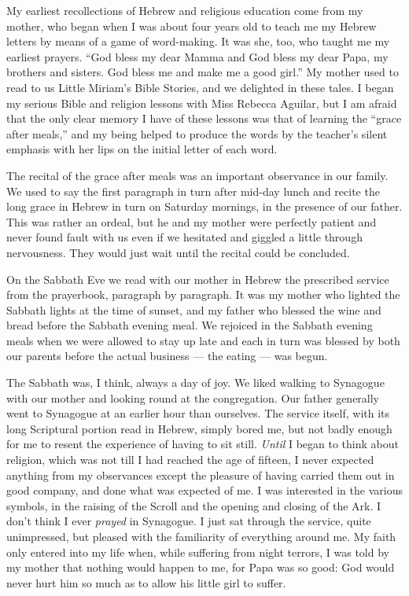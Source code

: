 My earliest recollections of Hebrew and religious
education come from my mother, who began when I was
about four years old to teach me my Hebrew letters by
means of a game of word-making. It was she, too, who
taught me my earliest prayers. “God bless my dear
Mamma and God bless my dear Papa, my brothers and
sisters. God bless me and make me a good girl.” My
mother used to read to us Little Miriam’s Bible Stories,
and we delighted in these tales. I began my serious
Bible and religion lessons with Miss Rebecca Aguilar,
but I am afraid that the only clear memory I have of
these lessons was that of learning the “grace after meals,”
and my being helped to produce the words by the teacher’s
silent emphasis with her lips on the initial letter of
each word.

The recital of the grace after meals was an important
observance in our family. We used to say the first
paragraph in turn after mid-day lunch and recite the
long grace in Hebrew in turn on Saturday mornings, in
the presence of our father. This was rather an ordeal,
but he and my mother were perfectly patient and never
found fault with us even if we hesitated and giggled
a little through nervousness. They would just wait until
the recital could be concluded.

On the Sabbath Eve we read with our mother in
Hebrew the prescribed service from the prayerbook,
paragraph by paragraph. It was my mother who lighted
the Sabbath lights at the time of sunset, and my father
who blessed the wine and bread before the Sabbath
evening meal. We rejoiced in the Sabbath evening meals
when we were allowed to stay up late and each in turn
was blessed by both our parents before the actual business
— the eating — was begun.

The Sabbath was, I think, always a day of joy. We
liked walking to Synagogue with our mother and looking
round at the congregation. Our father generally went to
Synagogue at an earlier hour than ourselves. The service
itself, with its long Scriptural portion read in Hebrew,
simply bored me, but not badly enough for me to resent
the experience of having to sit still. \textsl{Until} I began to
think about religion, which was not till I had reached the
age of fifteen, I never expected anything from my observances
except the pleasure of having carried them out
in good company, and done what was expected of me.
I was interested in the various symbols, in the raising
of the Scroll and the opening and closing of the Ark.
I don’t think I ever \textsl{prayed} in Synagogue. I just sat
through the service, quite unimpressed, but pleased with
the familiarity of everything around me. My faith only
entered into my life when, while suffering from night
terrors, I was told by my mother that nothing would
happen to me, for Papa was so good: God would never
hurt him so much as to allow his little girl to suffer.

